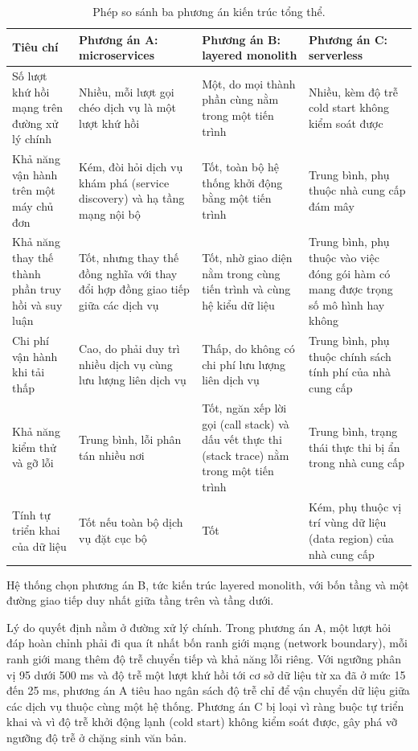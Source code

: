 \begin{table}[htbp]
    \centering
    \caption{Phép so sánh ba phương án kiến trúc tổng thể.}
    \label{tab:so-sanh-kien-truc}
    \footnotesize
    \begin{tabularx}{\textwidth}{@{}>{\raggedright\arraybackslash}p{2.9cm}>{\raggedright\arraybackslash}X>{\raggedright\arraybackslash}X>{\raggedright\arraybackslash}X@{}}
        \toprule
        \textbf{Tiêu chí} & \textbf{Phương án A: microservices} & \textbf{Phương án B: layered monolith} & \textbf{Phương án C: serverless} \\
        \midrule
        Số lượt khứ hồi mạng trên đường xử lý chính & Nhiều, mỗi lượt gọi chéo dịch vụ là một lượt khứ hồi & Một, do mọi thành phần cùng nằm trong một tiến trình & Nhiều, kèm độ trễ cold start không kiểm soát được \\
        Khả năng vận hành trên một máy chủ đơn & Kém, đòi hỏi dịch vụ khám phá (service discovery) và hạ tầng mạng nội bộ & Tốt, toàn bộ hệ thống khởi động bằng một tiến trình & Trung bình, phụ thuộc nhà cung cấp đám mây \\
        Khả năng thay thế thành phần truy hồi và suy luận & Tốt, nhưng thay thế đồng nghĩa với thay đổi hợp đồng giao tiếp giữa các dịch vụ & Tốt, nhờ giao diện nằm trong cùng tiến trình và cùng hệ kiểu dữ liệu & Trung bình, phụ thuộc vào việc đóng gói hàm có mang được trọng số mô hình hay không \\
        Chi phí vận hành khi tải thấp & Cao, do phải duy trì nhiều dịch vụ cùng lưu lượng liên dịch vụ & Thấp, do không có chi phí lưu lượng liên dịch vụ & Trung bình, phụ thuộc chính sách tính phí của nhà cung cấp \\
        Khả năng kiểm thử và gỡ lỗi & Trung bình, lỗi phân tán nhiều nơi & Tốt, ngăn xếp lời gọi (call stack) và dấu vết thực thi (stack trace) nằm trong một tiến trình & Trung bình, trạng thái thực thi bị ẩn trong nhà cung cấp \\
        Tính tự triển khai của dữ liệu & Tốt nếu toàn bộ dịch vụ đặt cục bộ & Tốt & Kém, phụ thuộc vị trí vùng dữ liệu (data region) của nhà cung cấp \\
        \bottomrule
    \end{tabularx}
\end{table}

Hệ thống chọn phương án B, tức kiến trúc layered monolith, với bốn tầng và một đường giao tiếp duy nhất giữa tầng trên và tầng dưới.

Lý do quyết định nằm ở đường xử lý chính. Trong phương án A, một lượt hỏi đáp hoàn chỉnh phải đi qua ít nhất bốn ranh giới mạng (network boundary), mỗi ranh giới mang thêm độ trễ chuyển tiếp và khả năng lỗi riêng. Với ngưỡng phân vị 95 dưới 500 ms và độ trễ một lượt khứ hồi tới cơ sở dữ liệu từ xa đã ở mức 15 đến 25 ms, phương án A tiêu hao ngân sách độ trễ chỉ để vận chuyển dữ liệu giữa các dịch vụ thuộc cùng một hệ thống. Phương án C bị loại vì ràng buộc tự triển khai và vì độ trễ khởi động lạnh (cold start) không kiểm soát được, gây phá vỡ ngưỡng độ trễ ở chặng sinh văn bản.

